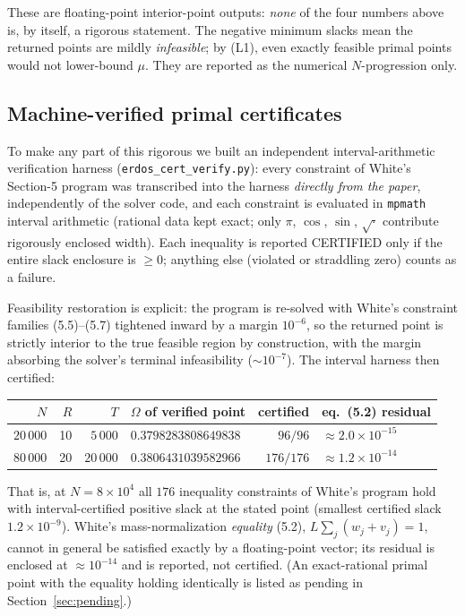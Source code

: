 \documentclass[11pt]{article}
\theoremstyle{remark}
\begin{document}
\noindent
These are floating-point interior-point outputs: \emph{none} of the four
numbers above is, by itself, a rigorous statement. The negative minimum
slacks mean the returned points are mildly \emph{infeasible}; by (L1), even
exactly feasible primal points would not lower-bound $\mu$. They are
reported as the numerical $N$-progression only.

\subsection{Machine-verified primal certificates}
\label{sec:verified}

To make any part of this rigorous we built an independent
interval-arithmetic verification harness
(\texttt{erdos\_cert\_verify.py}): every constraint of White's Section-5
program was transcribed into the harness \emph{directly from the paper},
independently of the solver code, and each constraint is evaluated in
\texttt{mpmath} interval arithmetic (rational data kept exact; only $\pi$,
$\cos$, $\sin$, $\sqrt{\cdot}$ contribute rigorously enclosed width). Each
inequality is reported CERTIFIED only if the entire slack enclosure is
$\ge 0$; anything else (violated or straddling zero) counts as a failure.

Feasibility restoration is explicit: the program is re-solved with White's
constraint families (5.5)--(5.7) tightened inward by a margin
$10^{-6}$, so the returned point is strictly interior to the true feasible
region by construction, with the margin absorbing the solver's terminal
infeasibility ($\sim 10^{-7}$). The interval harness then certified:

\begin{center}
\begin{tabular}{@{}rrrlrl@{}}
\toprule
$N$ & $R$ & $T$ & $\Omega$ of verified point & certified & eq.\ (5.2) residual\\
\midrule
$20\,000$ & 10 & $5\,000$  & $0.3798283808649838$ & $96/96$  & $\approx 2.0\times10^{-15}$ \\
$80\,000$ & 20 & $20\,000$ & $0.3806431039582966$ & $176/176$ & $\approx 1.2\times10^{-14}$ \\
\bottomrule
\end{tabular}
\end{center}

\noindent
That is, at $N = 8\times10^4$ all $176$ inequality constraints of White's
program hold with interval-certified positive slack at the stated point
(smallest certified slack $1.2\times10^{-9}$). White's mass-normalization
\emph{equality} (5.2), $L\sum_j (w_j + v_j) = 1$, cannot in general be
satisfied exactly by a floating-point vector; its residual is enclosed at
$\approx 10^{-14}$ and is reported, not certified. (An exact-rational
primal point with the equality holding identically is listed as pending in
Section~\ref{sec:pending}.)
\end{document}
